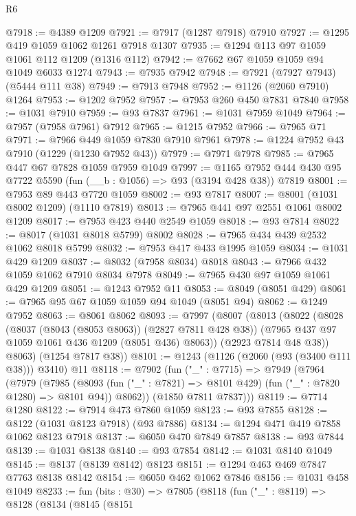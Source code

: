 \begin{lexlean}{R6}
\begin{coremodule}
@7918 := @4389 @1209
@7921 := @7917 (@1287 @7918) @7910
@7927 := @1295 @419 @1059 @1062 @1261 @7918 @1307
@7935 := @1294 @113 @97 @1059 @1061 @112 @1209 (@1316 @112)
@7942 := @7662 @67 @1059 @1059 @94 @1049 @6033 @1274
@7943 := @7935 @7942
@7948 := @7921 (@7927 @7943) (@5444 @111 @38)
@7949 := @7913 @7948
@7952 := @1126 (@2060 @7910) @1264
@7953 := @1202 @7952
@7957 := @7953 @260 @450 @7831 @7840
@7958 := @1031 @7910
@7959 := @93 @7837
@7961 := @1031 @7959 @1049
@7964 := @7957 (@7958 @7961) @7912
@7965 := @1215 @7952
@7966 := @7965 @71
@7971 := @7966 @449 @1059 @7830 @7910 @7961
@7978 := @1224 @7952 @43 @7910 (@1229 (@1230 @7952 @43))
@7979 := @7971 @7978
@7985 := @7965 @447 @67 @7828 @1059 @7959 @1049
@7997 := @1165 @7952 @444 @430 @95 @7722 @5590 (fun (__b : @1056) => @93 (@3194 @428 @38)) @7819
@8001 := @7953 @89 @443 @7720 @1059
@8002 := @93 @7817
@8007 := @8001 (@1031 @8002 @1209) (@1110 @7819)
@8013 := @7965 @441 @97 @2551 @1061 @8002 @1209
@8017 := @7953 @423 @440 @2549 @1059
@8018 := @93 @7814
@8022 := @8017 (@1031 @8018 @5799) @8002
@8028 := @7965 @434 @439 @2532 @1062 @8018 @5799
@8032 := @7953 @417 @433 @1995 @1059
@8034 := @1031 @429 @1209
@8037 := @8032 (@7958 @8034) @8018
@8043 := @7966 @432 @1059 @1062 @7910 @8034 @7978
@8049 := @7965 @430 @97 @1059 @1061 @429 @1209
@8051 := @1243 @7952 @11
@8053 := @8049 (@8051 @429)
@8061 := @7965 @95 @67 @1059 @1059 @94 @1049 (@8051 @94)
@8062 := @1249 @7952
@8063 := @8061 @8062
@8093 := @7997
    (@8007
      (@8013
        (@8022
          (@8028
            (@8037 (@8043 (@8053 @8063)) (@2827 @7811 @428 @38))
            (@7965 @437 @97 @1059 @1061 @436 @1209 (@8051 @436) @8063))
          (@2923 @7814 @48 @38))
        @8063)
      (@1254 @7817 @38))
@8101 := @1243 (@1126 (@2060 (@93 (@3400 @111 @38))) @3410) @11
@8118 := @7902
    (fun ("_" : @7715) =>
    @7949
      (@7964
        (@7979
          (@7985
            (@8093 (fun ("_" : @7821) => @8101 @429) (fun ("_" : @7820 @1280) => @8101 @94))
            @8062))
        (@1850 @7811 @7837)))
@8119 := @7714 @1280
@8122 := @7914 @473 @7860 @1059
@8123 := @93 @7855
@8128 := @8122 (@1031 @8123 @7918) (@93 @7886)
@8134 := @1294 @471 @419 @7858 @1062 @8123 @7918
@8137 := @6050 @470 @7849 @7857
@8138 := @93 @7844
@8139 := @1031 @8138
@8140 := @93 @7854
@8142 := @1031 @8140 @1049
@8145 := @8137 (@8139 @8142) @8123
@8151 := @1294 @463 @469 @7847 @7763 @8138 @8142
@8154 := @6050 @462 @1062 @7846
@8156 := @1031 @458 @1049
@8233 := fun (bits : @30) =>
  @7805
    (@8118
      (fun ("_" : @8119) =>
      @8128
        (@8134
          (@8145
            (@8151

\end{coremodule}
\end{lexlean}
